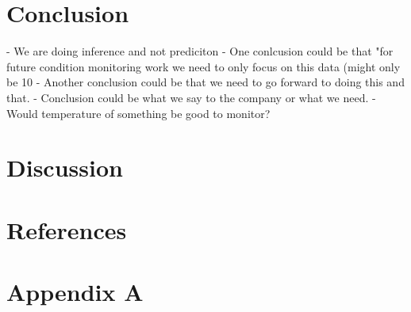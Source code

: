 \documentclass{article}
\begin{document}
\newpage  
\section{Conclusion}
- We are doing inference and not prediciton
- One conlcusion could be that "for future condition monitoring work we need to only focus on this data (might only be 10%
- Another conclusion could be that we need to go forward to doing this and that.
- Conclusion could be what we say to the company or what we need.
- Would temperature of something be good to monitor?
\newpage 
\section{Discussion} 

\newpage  
\section{References} 

 

\newpage  
\section{Appendix A}
\end{document}
